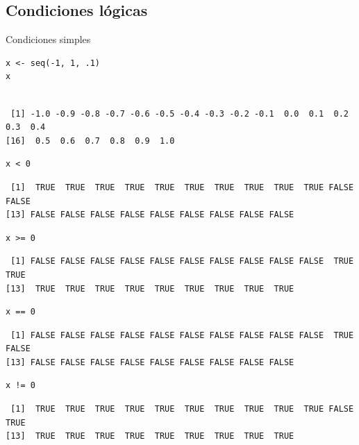 \documentclass[aspectratio=169, usenames,svgnames,dvipsnames]{beamer}
\begin{document}
\subsection{Condiciones lógicas}
\label{sec:orgb152f6f}
\begin{frame}[label={sec:org2f52958},fragile]{Condiciones simples}
 \lstset{language=r,label= ,caption= ,captionpos=b,numbers=none}
\begin{lstlisting}
x <- seq(-1, 1, .1)
x
\end{lstlisting}

\begin{verbatim}

 [1] -1.0 -0.9 -0.8 -0.7 -0.6 -0.5 -0.4 -0.3 -0.2 -0.1  0.0  0.1  0.2  0.3  0.4
[16]  0.5  0.6  0.7  0.8  0.9  1.0
\end{verbatim}


\lstset{language=r,label= ,caption= ,captionpos=b,numbers=none}
\begin{lstlisting}
x < 0
\end{lstlisting}

\begin{verbatim}
 [1]  TRUE  TRUE  TRUE  TRUE  TRUE  TRUE  TRUE  TRUE  TRUE  TRUE FALSE FALSE
[13] FALSE FALSE FALSE FALSE FALSE FALSE FALSE FALSE FALSE
\end{verbatim}


\lstset{language=r,label= ,caption= ,captionpos=b,numbers=none}
\begin{lstlisting}
x >= 0
\end{lstlisting}

\begin{verbatim}
 [1] FALSE FALSE FALSE FALSE FALSE FALSE FALSE FALSE FALSE FALSE  TRUE  TRUE
[13]  TRUE  TRUE  TRUE  TRUE  TRUE  TRUE  TRUE  TRUE  TRUE
\end{verbatim}


\lstset{language=r,label= ,caption= ,captionpos=b,numbers=none}
\begin{lstlisting}
x == 0
\end{lstlisting}

\begin{verbatim}
 [1] FALSE FALSE FALSE FALSE FALSE FALSE FALSE FALSE FALSE FALSE  TRUE FALSE
[13] FALSE FALSE FALSE FALSE FALSE FALSE FALSE FALSE FALSE
\end{verbatim}


\lstset{language=r,label= ,caption= ,captionpos=b,numbers=none}
\begin{lstlisting}
x != 0
\end{lstlisting}

\begin{verbatim}
 [1]  TRUE  TRUE  TRUE  TRUE  TRUE  TRUE  TRUE  TRUE  TRUE  TRUE FALSE  TRUE
[13]  TRUE  TRUE  TRUE  TRUE  TRUE  TRUE  TRUE  TRUE  TRUE
\end{verbatim}
\end{frame}
\end{document}
